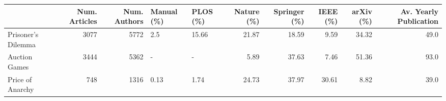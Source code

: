 \begin{tabular}{lrrllrrrrr}
\toprule
{} &  Num. Articles &  Num. Authors & Manual (\%) & PLOS (\%) &  Nature (\%) &  Springer (\%) &  IEEE (\%) &  arXiv (\%) &  Av. Yearly Publication \\
\midrule
Prisoner's Dilemma &           3077 &          5772 &        2.5 &    15.66 &       21.87 &         18.59 &      9.59 &      34.32 &                    49.0 \\
Auction Games      &           3444 &          5362 &          - &        - &        5.89 &         37.63 &      7.46 &      51.36 &                    93.0 \\
Price of Anarchy   &            748 &          1316 &       0.13 &     1.74 &       24.73 &         37.97 &     30.61 &       8.82 &                    39.0 \\
\bottomrule
\end{tabular}
